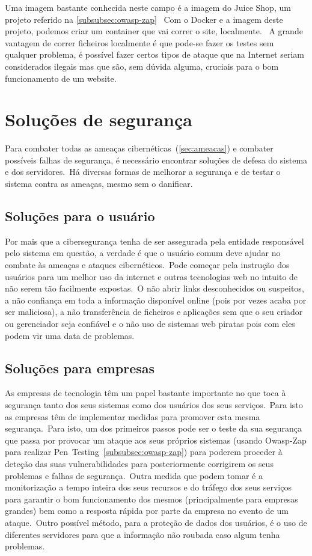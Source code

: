 \documentclass{report}
\begin{document}
Uma imagem bastante conhecida neste campo é a imagem do Juice Shop, um projeto referido na \autoref{subsubsec:owasp-zap} \ Com o Docker e a imagem deste projeto, podemos criar um container que vai correr o site, localmente. \ A grande vantagem de correr ficheiros localmente é que pode-se fazer os testes sem qualquer problema, é possível fazer certos tipos de ataque que na Internet seriam considerados ilegais mas que são, sem dúvida alguma, cruciais para o bom funcionamento de um website.

\chapter{Soluções de segurança}
\label{ch:solucoes-de-seguranca}
Para combater todas as ameaças cibernéticas~(\ref{sec:ameacas}) e combater possíveis falhas de segurança, é necessário encontrar soluções de defesa do sistema e dos servidores.\ Há diversas formas de melhorar a segurança e de testar o sistema contra as ameaças, mesmo sem o danificar.
\section{Soluções para o usuário}
Por mais que a cibersegurança tenha de ser assegurada pela entidade responsável pelo sistema em questão, a verdade é que o usuário comum deve ajudar no combate às ameaças e ataques cibernéticos.\ Pode começar pela instrução dos usuários para um melhor uso da internet e outras tecnologias web no intuito de não serem tão facilmente expostas.\ O não abrir links desconhecidos ou suspeitos, a não confiança em toda a informação disponível online (pois por vezes acaba por ser maliciosa), a não transferência de ficheiros e aplicações sem que o seu criador ou gerenciador seja confiável e o não uso de sistemas web piratas pois com eles podem vir uma data de problemas.
\section{Soluções para empresas}
As empresas de tecnologia têm um papel bastante importante no que toca à segurança tanto dos seus sistemas como dos usuários dos seus serviços.\ Para isto as empresas têm de implementar medidas para promover esta mesma segurança.\ Para isto, um dos primeiros passos pode ser o teste da sua segurança que passa por provocar um ataque aos seus próprios sistemas (usando Owasp-Zap para realizar Pen~Testing~\ref{subsubsec:owasp-zap}) para poderem proceder à deteção das suas vulnerabilidades para posteriormente corrigirem os seus problemas e falhas de segurança.\ Outra medida que podem tomar é a monitorização a tempo inteira dos seus recursos e do tráfego dos seus serviços para garantir o bom funcionamento dos mesmos (principalmente para empresas grandes) bem como a resposta rápida por parte da empresa no evento de um ataque.\ Outro possível método, para a proteção de dados dos usuários, é o uso de diferentes servidores para que a informação não roubada caso algum tenha problemas.
\end{document}
